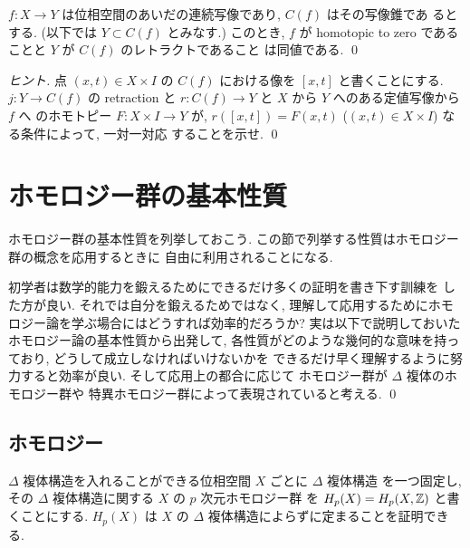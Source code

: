 \documentclass[12pt,twoside]{jarticle}
\begin{document}
\begin{question}
  $f: X\to Y$ は位相空間のあいだの連続写像であり, $C(f)$ はその写像錐であ
  るとする. (以下では $Y\subset C(f)$ とみなす.) このとき, $f$ が 
  homotopic to zero であることと $Y$ が $C(f)$ のレトラクトであること
  は同値である. \qed
\end{question}

\begin{proof}[ヒント]
点 $(x,t)\in X\times I$ の $C(f)$ における像を 
$[x,t]$ と書くことにする.  $j : Y \to C(f)$ の retraction と %
$r : C(f)\to Y$ と $X$ から $Y$ へのある定値写像から $f$ へ%
のホモトピー $F : X\times I \to Y$ が, %
$r([x,t])=F(x,t)$ ($(x,t)\in X\times I$) なる条件によって, 一対一対応
することを示せ. \qed
\end{proof}


\section{ホモロジー群の基本性質}

ホモロジー群の基本性質を列挙しておこう.
この節で列挙する性質はホモロジー群の概念を応用するときに
自由に利用されることになる.

\begin{guide}[実用的なホモロジー論の理解の仕方]
 初学者は数学的能力を鍛えるためにできるだけ多くの証明を書き下す訓練を
 した方が良い. それでは自分を鍛えるためではなく, 
 理解して応用するためにホモロジー論を学ぶ場合にはどうすれば効率的だろうか? 
 実は以下で説明しておいたホモロジー論の基本性質から出発して, 
 各性質がどのような幾何的な意味を持っており, 
 どうして成立しなければいけないかを
 できるだけ早く理解するように努力すると効率が良い.
 そして応用上の都合に応じて
 ホモロジー群が $\Delta$ 複体のホモロジー群や
 特異ホモロジー群によって表現されていると考える.
 \qed
\end{guide}


\subsection{ホモロジー}

$\Delta$ 複体構造を入れることができる位相空間 $X$ ごとに $\Delta$ 複体構造
を一つ固定し, その $\Delta$ 複体構造に関する $X$ の $p$ 次元ホモロジー群
を $H_p(X)=H_p(X,{\mathbb Z})$ と書くことにする. 
$H_p(X)$ は $X$ の $\Delta$ 複体構造によらずに定まることを証明できる.
\end{document}
